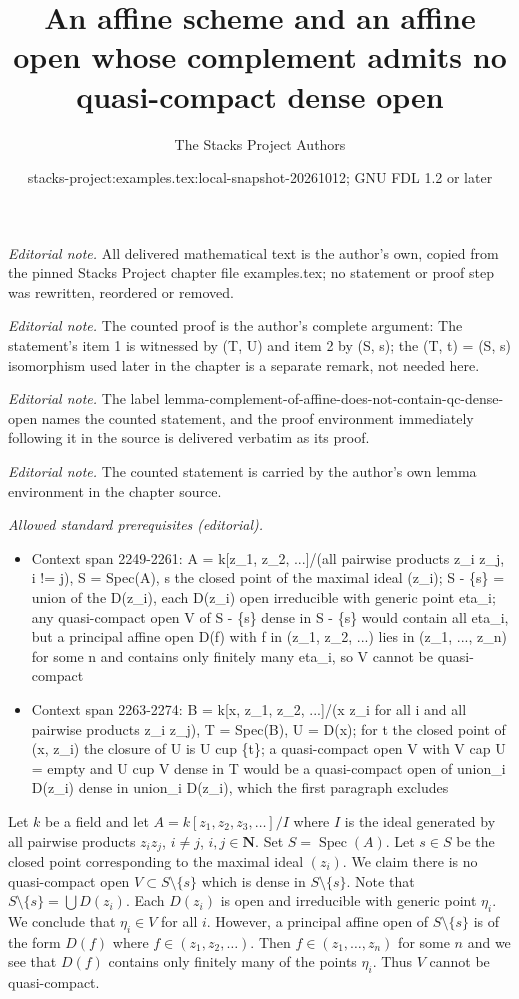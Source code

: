 \documentclass[10pt,a4paper]{amsart}
\title{An affine scheme and an affine open whose complement admits no quasi-compact dense open}
\author{The Stacks Project Authors}
\date{stacks-project:examples.tex:local-snapshot-20261012; GNU FDL 1.2 or later}
\theoremstyle{plain}
\theoremstyle{definition}
\theoremstyle{remark}
\numberwithin{equation}{subsection}
\def\Spec{\mathop{\mathrm{Spec}}}
\begin{document}
\maketitle
\noindent\textit{Editorial note.} All delivered mathematical text is the author's own, copied from the pinned Stacks Project chapter file examples.tex; no statement or proof step was rewritten, reordered or removed.\par\medskip
\noindent\textit{Editorial note.} The counted proof is the author's complete argument: The statement's item 1 is witnessed by (T, U) and item 2 by (S, s); the (T, t) = (S, s) isomorphism used later in the chapter is a separate remark, not needed here.\par\medskip
\noindent\textit{Editorial note.} The label lemma-complement-of-affine-does-not-contain-qc-dense-open names the counted statement, and the proof environment immediately following it in the source is delivered verbatim as its proof.\par\medskip
\noindent\textit{Editorial note.} The counted statement is carried by the author's own lemma environment in the chapter source.\par\medskip
\noindent\textit{Allowed standard prerequisites (editorial).}\begin{itemize}
\item Context span 2249-2261: A = k[z\_1, z\_2, ...]/(all pairwise products z\_i z\_j, i != j), S = Spec(A), s the closed point of the maximal ideal (z\_i); S - \{s\} = union of the D(z\_i), each D(z\_i) open irreducible with generic point eta\_i; any quasi-compact open V of S - \{s\} dense in S - \{s\} would contain all eta\_i, but a principal affine open D(f) with f in (z\_1, z\_2, ...) lies in (z\_1, ..., z\_n) for some n and contains only finitely many eta\_i, so V cannot be quasi-compact
\item Context span 2263-2274: B = k[x, z\_1, z\_2, ...]/(x z\_i for all i and all pairwise products z\_i z\_j), T = Spec(B), U = D(x); for t the closed point of (x, z\_i) the closure of U is U cup \{t\}; a quasi-compact open V with V cap U = empty and U cup V dense in T would be a quasi-compact open of union\_i D(z\_i) dense in union\_i D(z\_i), which the first paragraph excludes
\end{itemize}\medskip
Let $k$ be a field and let $A = k[z_1, z_2, z_3, \ldots]/I$ where $I$
is the ideal generated by all pairwise products
$z_iz_j$, $i \not = j$, $i, j \in \mathbf{N}$. Set $S = \Spec(A)$.
Let $s \in S$ be the closed point corresponding to the maximal
ideal $(z_i)$. We claim there is no
quasi-compact open $V \subset S \setminus \{s\}$ which is
dense in $S \setminus \{s\}$. Note that $S \setminus \{s\} = \bigcup D(z_i)$.
Each $D(z_i)$ is open and irreducible with generic point
$\eta_i$. We conclude that $\eta_i \in V$ for all $i$.
However, a principal affine open of $S \setminus \{s\}$ is
of the form $D(f)$ where $f \in (z_1, z_2, \ldots)$. Then
$f \in (z_1, \ldots, z_n)$ for some $n$ and we see that $D(f)$ contains
only finitely many of the points $\eta_i$. Thus $V$ cannot be quasi-compact.
\end{document}

